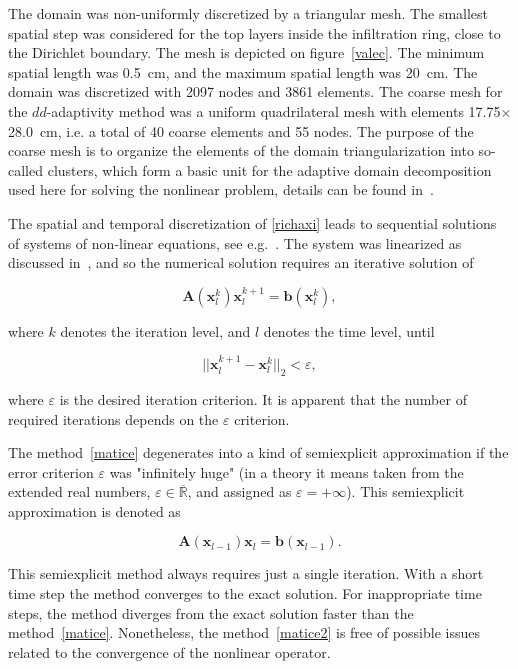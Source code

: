 \documentclass[review,times,3p,10pt]{elsarticle}
\newenvironment{lineq}
    {\begin{linenomath*}
    \begin{equation}
    }
    { 
    \end{equation} 
    \end{linenomath*}
    }
\renewcommand{\vec}{\mathbf}
\begin{document}
 The domain was non-uniformly discretized by a triangular mesh. The smallest spatial step was considered for the top layers inside the infiltration ring, close to the Dirichlet boundary. The mesh is depicted on figure~\ref{valec}. The minimum spatial length was 0.5~cm, and the maximum spatial length was 20~cm. The domain was discretized with 2097 nodes and 3861 elements. The coarse mesh for the $dd$-adaptivity method was a uniform quadrilateral mesh with elements 17.75$\times$28.0~cm, i.e. a total of 40 coarse elements and 55 nodes. The purpose of the coarse mesh is to organize the elements of the domain triangularization into so-called clusters, which form a basic unit for the adaptive domain decomposition used here for solving the nonlinear problem, details can be found in~\citep{mojeamc2}.

 
 The spatial and temporal discretization of \eqref{richaxi} leads to sequential solutions of systems of non-linear equations, see e.g.~\citep{mojecomp}. The system was linearized as discussed in~\citet{mojeacta, mojeamc}, and so the numerical solution requires an iterative solution of 
\begin{lineq}
\label{matice}
\mathbf{A}(\vec{x}_l^k) \vec{x}_l^{k+1} = \vec{b}(\vec{x}_l^k),
\end{lineq}
where $k$ denotes the iteration level, and $l$ denotes the time level, until \begin{lineq} \label{picard} ||\vec{x}_l^{k+1} - \vec{x}_l^k||_2 < \varepsilon , \end{lineq} where $\varepsilon$ is the desired iteration criterion.  It is apparent that the number of required  iterations depends on the $\varepsilon$ criterion. 


The method~\eqref{matice} degenerates into a kind of semiexplicit approximation if the error criterion $\varepsilon$ was "infinitely huge" (in a theory it means taken from the extended real numbers, $\varepsilon \in {\overline {\mathbb {R} }}$, and assigned as $\varepsilon = + \infty$). This semiexplicit approximation is denoted as
\begin{lineq}
\label{matice2}
\mathbf{A}(\vec{x}_{l-1}) \vec{x}_l = \vec{b}(\vec{x}_{l-1}).
\end{lineq}
 This semiexplicit method always requires just a single  iteration. With a short time step the method converges to the exact solution. For inappropriate time steps, the method diverges from the exact solution faster than the method~\eqref{matice}. Nonetheless, the method~\eqref{matice2} is free of possible issues related to the convergence of the nonlinear operator.
\end{document}
